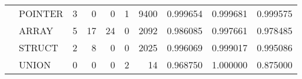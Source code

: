 \begin{table}
\begin{tabular}{llrrrrrrrr}
      & POINTER &                                  3 &                                 0 &                                0 &                                 1 &                            9400 &                        0.999654 &                               0.999681 &                             0.999575 \\
      & ARRAY &                                  5 &                                17 &                               24 &                                 0 &                            2092 &                        0.986085 &                               0.997661 &                             0.978485 \\
      & STRUCT &                                  2 &                                 8 &                                0 &                                 0 &                            2025 &                        0.996069 &                               0.999017 &                             0.995086 \\
      & UNION &                                  0 &                                 0 &                                0 &                                 2 &                              14 &                        0.968750 &                               1.000000 &                             0.875000 \\
\bottomrule
\end{tabular}
\end{table}
